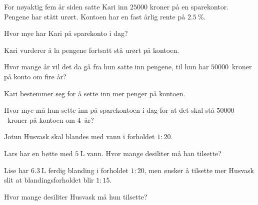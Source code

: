 For nøyaktig fem år siden satte Kari inn $\num{25000}$ kroner på en sparekontor.
Pengene har stått urørt. Kontoen har en fast årlig rente på
$\SI{2.5}{\percent}$.

\begin{oppgaver}
   Hvor mye har Kari på sparekonto i dag?
\end{oppgaver}

Kari vurderer å la pengene fortsatt stå urørt på kontoen.

\begin{oppgaver}
   Hvor mange år vil det da gå fra hun satte inn pengene, til hun har
    $\num{50000}$~kroner på konto om fire år?
\end{oppgaver}

Kari bestemmer seg for å sette inn mer penger på kontoen.

\begin{oppgaver}
   Hvor mye må hun sette inn på sparekontoen i dag for at det skal stå
    $\num{50000}$~kroner på kontoen om $4$~år?
\end{oppgaver}


\Oppgave[3]

Jotun Husvask skal blandes med vann i forholdet $1:20$.

\begin{oppgaver}
   Lars har en bøtte med $\SI{5}{\L}$ vann. Hvor mange desiliter må
    han tilsette?
\end{oppgaver}

Lise har $\SI{6.3}{\L}$ ferdig blanding i forholdet $1:20$, men ønsker å
tilsette mer Husvask slit at blandingsforholdet blir $1:15$.

\begin{oppgaver}
   Hvor mange desiliter Husvask må hun tilsette?
\end{oppgaver}


\Oppgave[5] 

